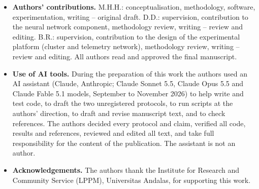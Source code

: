 \documentclass[referee,lineno,pdflatex,sn-basic]{sn-jnl}%
\theoremstyle{thmstyleone}%
\theoremstyle{thmstyletwo}%
\theoremstyle{thmstylethree}%
\begin{document}
\begin{itemize}
\item \textbf{Authors' contributions.} M.H.H.: conceptualisation, methodology, software, experimentation, writing -- original draft. D.D.: supervision, contribution to the neural network component, methodology review, writing -- review and editing. B.R.: supervision, contribution to the design of the experimental platform (cluster and telemetry network), methodology review, writing -- review and editing. All authors read and approved the final manuscript.
\item \textbf{Use of AI tools.} During the preparation of this work the authors used an AI assistant (Claude, Anthropic; Claude Sonnet 5.5, Claude Opus 5.5 and Claude Fable 5.1 models, September to November 2026) to help write and test code, to draft the two unregistered protocols, to run scripts at the authors' direction, to draft and revise manuscript text, and to check references. The authors decided every protocol and claim, verified all code, results and references, reviewed and edited all text, and take full responsibility for the content of the publication. The assistant is not an author.
\item \textbf{Acknowledgements.} The authors thank the Institute for Research and Community Service (LPPM), Universitas Andalas, for supporting this work.
\end{itemize}





\end{document}
